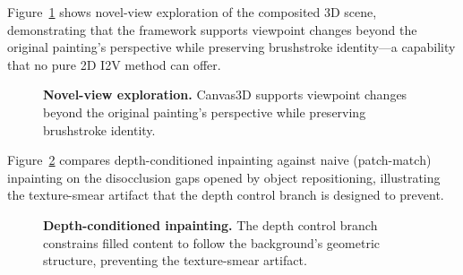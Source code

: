 Figure~\ref{fig:qual_novelview} shows novel-view exploration of the
composited 3D scene, demonstrating that the framework supports
viewpoint changes beyond the original painting's perspective while
preserving brushstroke identity---a capability that no pure 2D I2V
method can offer.

\begin{figure}[t]
    \centering
    \caption{\textbf{Novel-view exploration.} Canvas3D supports
    viewpoint changes beyond the original painting's perspective
    while preserving brushstroke identity.}
    \label{fig:qual_novelview}
\end{figure}

Figure~\ref{fig:qual_inpainting} compares depth-conditioned inpainting
against naive (patch-match) inpainting on the disocclusion gaps opened
by object repositioning, illustrating the texture-smear artifact that
the depth control branch is designed to prevent.

\begin{figure}[t]
    \centering
    \caption{\textbf{Depth-conditioned inpainting.} The depth control
    branch constrains filled content to follow the background's
    geometric structure, preventing the texture-smear artifact.}
    \label{fig:qual_inpainting}
\end{figure}
